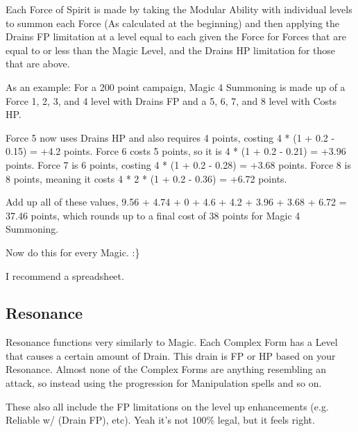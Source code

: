 \begin{multicols*}{2}
	Each Force of Spirit is made by taking the Modular Ability with individual levels to summon each Force (As calculated at the beginning) and then applying the Drains FP limitation at a level equal to each given the Force for Forces that are equal to or less than the Magic Level, and the Drains HP limitation for those that are above. 
	
	As an example: For a 200 point campaign, Magic 4 Summoning is made up of a Force 1, 2, 3, and 4 level with Drains FP and a 5, 6, 7, and 8 level with Costs HP. 
	
	
	
	
	Force 5 now uses Drains HP and also requires 4 points, costing 4 * (1 + 0.2 - 0.15) = +4.2 points. Force 6 costs 5 points, so it is 4 * (1 + 0.2 - 0.21) = +3.96 points. Force 7 is 6 points, costing 4 * (1 + 0.2 - 0.28) = +3.68 points. Force 8 is 8 points, meaning it costs 4 * 2 * (1 + 0.2 - 0.36) = +6.72 points.
	
	Add up all of these values, 9.56 + 4.74 + 0 + 4.6 + 4.2 + 3.96 + 3.68 + 6.72 = 37.46 points, which rounds up to a final cost of 38 points for Magic 4 Summoning.
	
	Now do this for every Magic. :\}
	
	I recommend a spreadsheet.
	
	\subsection{Resonance}
	
	Resonance functions very similarly to Magic. Each Complex Form has a Level that causes a certain amount of Drain. This drain is FP or HP based on your Resonance. Almost none of the Complex Forms are anything resembling an attack, so instead using the progression for Manipulation spells and so on.
	
	These also all include the FP limitations on the level up enhancements (e.g. Reliable w/ (Drain FP), etc). Yeah it's not 100\% legal, but it feels right.
	

\end{multicols*}
